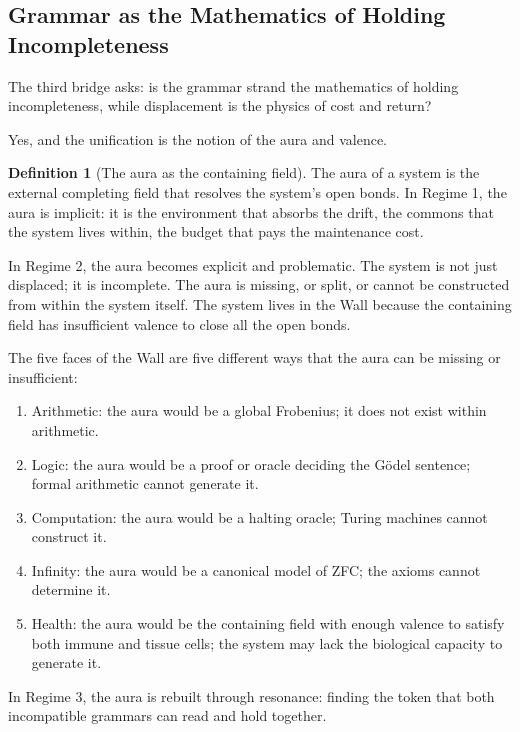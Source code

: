 \documentclass[12pt]{article}
\theoremstyle{definition}
\newtheorem{definition}[theorem]{Definition}
\theoremstyle{remark}
\begin{document}
\subsection{Grammar as the Mathematics of Holding Incompleteness}

The third bridge asks: is the grammar strand the mathematics of holding incompleteness, while displacement is the physics of cost and return?

Yes, and the unification is the notion of the aura and valence.

\begin{definition}[The aura as the containing field]
The aura of a system is the external completing field that resolves the system's open bonds. In Regime 1, the aura is implicit: it is the environment that absorbs the drift, the commons that the system lives within, the budget that pays the maintenance cost.

In Regime 2, the aura becomes explicit and problematic. The system is not just displaced; it is incomplete. The aura is missing, or split, or cannot be constructed from within the system itself. The system lives in the Wall because the containing field has insufficient valence to close all the open bonds.

The five faces of the Wall are five different ways that the aura can be missing or insufficient:
\begin{enumerate}
\item Arithmetic: the aura would be a global Frobenius; it does not exist within arithmetic.
\item Logic: the aura would be a proof or oracle deciding the Gödel sentence; formal arithmetic cannot generate it.
\item Computation: the aura would be a halting oracle; Turing machines cannot construct it.
\item Infinity: the aura would be a canonical model of ZFC; the axioms cannot determine it.
\item Health: the aura would be the containing field with enough valence to satisfy both immune and tissue cells; the system may lack the biological capacity to generate it.
\end{enumerate}

In Regime 3, the aura is rebuilt through resonance: finding the token that both incompatible grammars can read and hold together.
\end{definition}
\end{document}
